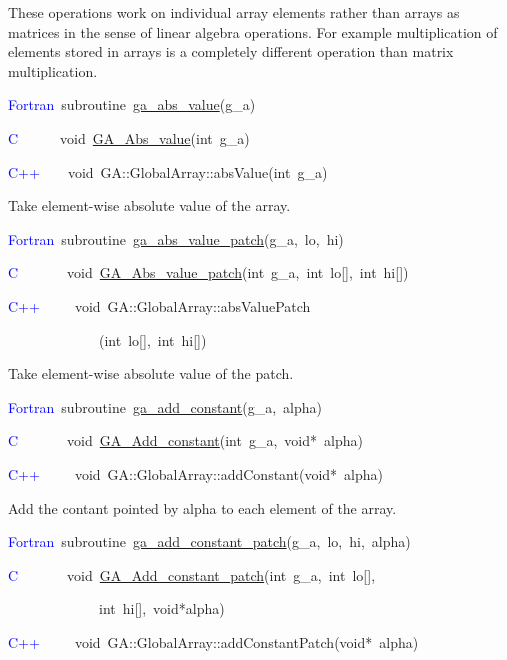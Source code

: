 These operations work on individual array elements rather than arrays
as matrices in the sense of linear algebra operations. For example
multiplication of elements stored in arrays is a completely different
operation than matrix multiplication.
\begin{lyxcode}
\textcolor{blue}{Fortran}~subroutine~\href{http://www.emsl.pnl.gov/docs/global/ga_ops.html\#ga_abs_value}{ga\_{}abs\_{}value}(g\_a)~

\textcolor{blue}{C}~~~~~~void~\href{http://www.emsl.pnl.gov/docs/global/c_nga_ops.html\#ga_abs_value}{GA\_{}Abs\_{}value}(int~g\_a)

\textcolor{blue}{C++}~~~~void~GA::GlobalArray::absValue(int~g\_a)
\end{lyxcode}
Take element-wise absolute value of the array. 
\begin{lyxcode}
\textcolor{blue}{Fortran}~subroutine~\href{http://www.emsl.pnl.gov/docs/global/ga_ops.html\#ga_abs_value_patch}{ga\_{}abs\_{}value\_{}patch}(g\_a,~lo,~hi)~

\textcolor{blue}{C}~~~~~~~void~\href{http://www.emsl.pnl.gov/docs/global/c_nga_ops.html\#ga_abs_value_patch}{GA\_{}Abs\_{}value\_{}patch}(int~g\_a,~int~lo{[}{]},~int~hi{[}{]})~

\textcolor{blue}{C++}~~~~~void~GA::GlobalArray::absValuePatch

~~~~~~~~~~~~~(int~lo{[}{]},~int~hi{[}{]})
\end{lyxcode}
Take element-wise absolute value of the patch.
\begin{lyxcode}
\textcolor{blue}{Fortran}~subroutine~\href{http://www.emsl.pnl.gov/docs/global/ga_ops.html\#ga_add_constant}{ga\_{}add\_{}constant}(g\_a,~alpha)~

\textcolor{blue}{C}~~~~~~~void~\href{http://www.emsl.pnl.gov/docs/global/c_nga_ops.html\#ga_add_constant}{GA\_{}Add\_{}constant}(int~g\_a,~void{*}~alpha)~

\textcolor{blue}{C++}~~~~~void~GA::GlobalArray::addConstant(void{*}~alpha)
\end{lyxcode}
Add the contant pointed by alpha to each element of the array. 
\begin{lyxcode}
\textcolor{blue}{Fortran}~subroutine~\href{http://www.emsl.pnl.gov/docs/global/ga_ops.html\#ga_add_constant_patch}{ga\_{}add\_{}constant\_{}patch}(g\_a,~lo,~hi,~alpha)~

\textcolor{blue}{C}~~~~~~~void~\href{http://www.emsl.pnl.gov/docs/global/c_nga_ops.html\#ga_add_constant_patch}{GA\_{}Add\_{}constant\_{}patch}(int~g\_a,~int~lo{[}{]},~

~~~~~~~~~~~~~int~hi{[}{]},~void{*}alpha)~

\textcolor{blue}{C++}~~~~~void~GA::GlobalArray::addConstantPatch(void{*}~alpha)
\end{lyxcode}
